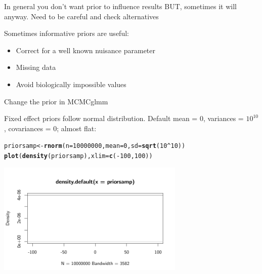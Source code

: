 \documentclass[10pt]{beamer}\usepackage[]{graphicx}\usepackage[]{color}
\makeatletter
\newcommand{\hlnum}[1]{\textcolor[rgb]{0.686,0.059,0.569}{#1}}%
\newcommand{\hlopt}[1]{\textcolor[rgb]{0,0,0}{#1}}%
\newcommand{\hlstd}[1]{\textcolor[rgb]{0.345,0.345,0.345}{#1}}%
\newcommand{\hlkwb}[1]{\textcolor[rgb]{0.69,0.353,0.396}{#1}}%
\newcommand{\hlkwc}[1]{\textcolor[rgb]{0.333,0.667,0.333}{#1}}%
\newcommand{\hlkwd}[1]{\textcolor[rgb]{0.737,0.353,0.396}{\textbf{#1}}}%
\newenvironment{kframe}{%
 \def\at@end@of@kframe{}%
 \ifinner\ifhmode%
  \def\at@end@of@kframe{\end{minipage}}%
  \begin{minipage}{\columnwidth}%
 \fi\fi%
 \def\FrameCommand##1{\hskip\@totalleftmargin \hskip-\fboxsep
 \colorbox{shadecolor}{##1}\hskip-\fboxsep
     \hskip-\linewidth \hskip-\@totalleftmargin \hskip\columnwidth}%
 \MakeFramed {\advance\hsize-\width
   \@totalleftmargin\z@ \linewidth\hsize
   \@setminipage}}%
 {\par\unskip\endMakeFramed%
 \at@end@of@kframe}
\newenvironment{knitrout}{}{} %
\makeatother
\begin{document}
\begin{frame}{In general you don't want prior to influence results}
\large
\alert{BUT, sometimes it will anyway. Need to be careful and check alternatives}

  \begin{exampleblock}{Sometimes informative priors are useful:}
    \begin{itemize}
      \item Correct for a well known nuisance parameter
      \item Missing data
      \item Avoid biologically impossible values
    \end{itemize}
  \end{exampleblock}

\end{frame}

\begin{frame}[fragile]{Change the prior in MCMCglmm}

Fixed effect priors follow normal distribution. Default mean = 0, variances = $10^{10}$, covariances = 0; almost flat:

\begin{knitrout}\small
{}\color{fgcolor}\begin{kframe}
\begin{alltt}
\hlstd{priorsamp} \hlkwb{<-} \hlkwd{rnorm}\hlstd{(}\hlkwc{n} \hlstd{=} \hlnum{10000000}\hlstd{,} \hlkwc{mean} \hlstd{=} \hlnum{0}\hlstd{,} \hlkwc{sd} \hlstd{=} \hlkwd{sqrt}\hlstd{(}\hlnum{10}\hlopt{^}\hlnum{10}\hlstd{))}
\hlkwd{plot}\hlstd{(}\hlkwd{density}\hlstd{(priorsamp),} \hlkwc{xlim}\hlstd{=}\hlkwd{c}\hlstd{(}\hlopt{-}\hlnum{100}\hlstd{,} \hlnum{100}\hlstd{))}
\end{alltt}
\end{kframe}
\includegraphics[width=0.67\textwidth,height=0.5\textwidth]{figure/simpr-1} 

\end{knitrout}

\end{frame}
\end{document}
